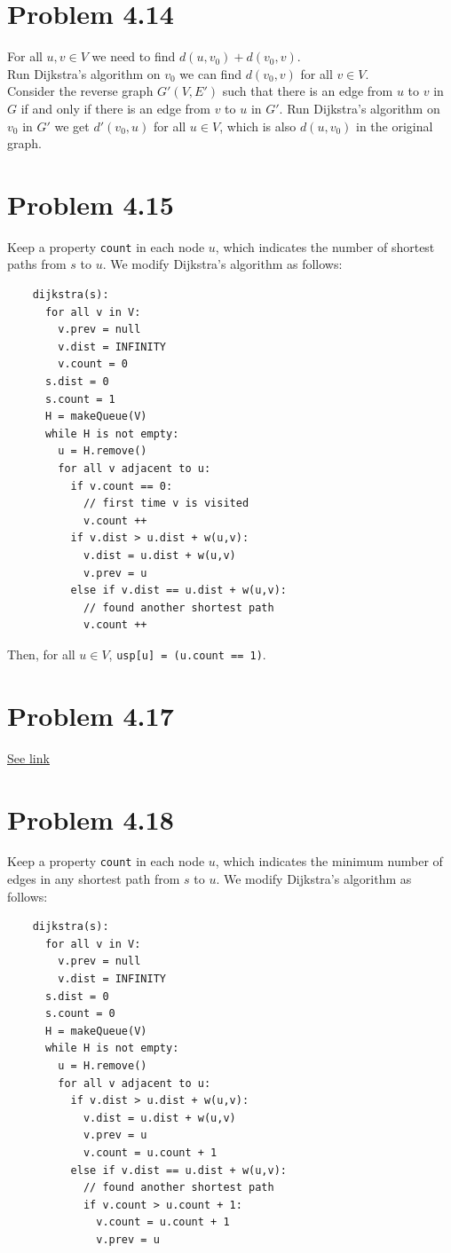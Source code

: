 \documentclass[12pt]{report}
\newcommand{\co}{\texttt}
\begin{document}
\section{Problem 4.14}
For all $u, v \in V$ we need to find $d(u,v_0) + d(v_0, v)$. \\
Run Dijkstra's algorithm on $v_0$ we can find $d(v_0, v)$ for all $v \in V$. \\
Consider the reverse graph $G'(V,E')$ such that there is an edge from $u$ to $v$ in $G$ if and only if there is an edge from $v$ to $u$ in $G'$. Run Dijkstra's algorithm on $v_0$ in $G'$ we get $d'(v_0, u)$ for all $u \in V$, which is also $d(u, v_0)$ in the original graph. 

\section{Problem 4.15}
Keep a property \co{count} in each node $u$, which indicates the number of shortest paths from $s$ to $u$. We modify Dijkstra's algorithm as follows:
\begin{lstlisting}
    dijkstra(s):
      for all v in V:
        v.prev = null
        v.dist = INFINITY
        v.count = 0
      s.dist = 0
      s.count = 1
      H = makeQueue(V)
      while H is not empty:
        u = H.remove()
        for all v adjacent to u:
          if v.count == 0:
            // first time v is visited
            v.count ++
          if v.dist > u.dist + w(u,v):
            v.dist = u.dist + w(u,v)
            v.prev = u
          else if v.dist == u.dist + w(u,v):
            // found another shortest path
            v.count ++
\end{lstlisting}
Then, for all $u \in V$, \co{usp[u] = (u.count == 1)}.

\section{Problem 4.17}
\href{http://cs.stackexchange.com/questions/6797/modifying-dijkstras-algorithm-for-edge-weights-drawn-from-range-1-k}{\underline{See link}}

\section{Problem 4.18}
Keep a property \co{count} in each node $u$, which indicates the minimum number of edges in any shortest path from $s$ to $u$. We modify Dijkstra's algorithm as follows:
\begin{lstlisting}
    dijkstra(s):
      for all v in V:
        v.prev = null
        v.dist = INFINITY
      s.dist = 0
      s.count = 0
      H = makeQueue(V)
      while H is not empty:
        u = H.remove()
        for all v adjacent to u:
          if v.dist > u.dist + w(u,v):
            v.dist = u.dist + w(u,v)
            v.prev = u
            v.count = u.count + 1
          else if v.dist == u.dist + w(u,v):
            // found another shortest path
            if v.count > u.count + 1:
              v.count = u.count + 1
              v.prev = u
\end{lstlisting}
\end{document}
